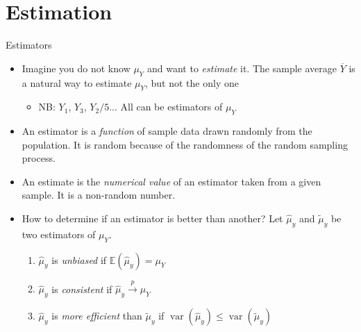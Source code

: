 \documentclass[notes,10pt, aspectratio=169]{beamer}
\begin{document}
\section{Estimation}
\begin{frame}{Estimators}
\begin{itemize}
    \item Imagine you do not know $\mu_Y$ and want to \textit{estimate} it. The sample average $\overline{Y}$ is a natural way to estimate $\mu_Y$, but not the only one
    \begin{itemize}
        \item NB: $Y_1$, $Y_3$, $Y_2/5$... All can be estimators of $\mu_Y$
    \end{itemize}
    \item An estimator is a \textit{function} of sample data drawn randomly from the population. It is random because of the randomness of the random sampling process.
    \item An estimate is the \textit{numerical value} of an estimator taken from a given sample. It is a non-random number.
    \item How to determine if an estimator is better than another? Let $\hat{\mu}_y$ and $\tilde{\mu}_y$ be two estimators of $\mu_Y$.
    \begin{enumerate}
        \item $\hat{\mu}_y$ is \textit{unbiased} if $\mathbb{E}(\hat{\mu}_y) = \mu_Y$
        \item $\hat{\mu}_y$ is \textit{consistent} if $\hat{\mu}_y \xrightarrow{\mathit{p}}\mu_Y$
        \item $\hat{\mu}_y$ is \textit{more efficient}  than $\tilde{\mu}_y$ if $\operatorname{var}(\hat{\mu}_y) \leq \operatorname{var}(\tilde{\mu}_y)$
    \end{enumerate}
\end{itemize}
\end{frame}
\end{document}

